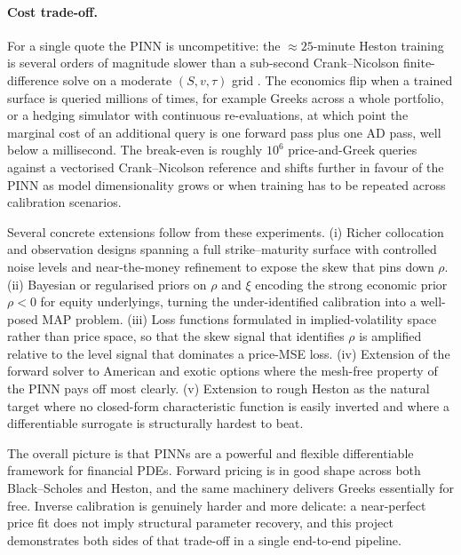 \paragraph{Cost trade-off.} For a single quote the PINN is uncompetitive: the $\approx 25$-minute Heston training is several orders of magnitude slower than a sub-second Crank--Nicolson finite-difference solve on a moderate $(S,v,\tau)$ grid \parencite{tavella2000pricing,achdou2005computational}. The economics flip when a trained surface is queried millions of times, for example Greeks across a whole portfolio, or a hedging simulator with continuous re-evaluations, at which point the marginal cost of an additional query is one forward pass plus one AD pass, well below a millisecond. The break-even is roughly $10^{6}$ price-and-Greek queries against a vectorised Crank--Nicolson reference and shifts further in favour of the PINN as model dimensionality grows or when training has to be repeated across calibration scenarios.

Several concrete extensions follow from these experiments. (i) Richer collocation and observation designs spanning a full strike--maturity surface with controlled noise levels and near-the-money refinement to expose the skew that pins down $\rho$. (ii) Bayesian or regularised priors on $\rho$ and $\xi$ encoding the strong economic prior $\rho<0$ for equity underlyings, turning the under-identified calibration into a well-posed MAP problem. (iii) Loss functions formulated in implied-volatility space rather than price space, so that the skew signal that identifies $\rho$ is amplified relative to the level signal that dominates a price-MSE loss. (iv) Extension of the forward solver to American and exotic options where the mesh-free property of the PINN pays off most clearly. (v) Extension to rough Heston \parencite{euch2019roughheston} as the natural target where no closed-form characteristic function is easily inverted and where a differentiable surrogate is structurally hardest to beat.

The overall picture is that PINNs are a powerful and flexible differentiable framework for financial PDEs. Forward pricing is in good shape across both Black--Scholes and Heston, and the same machinery delivers Greeks essentially for free. Inverse calibration is genuinely harder and more delicate: a near-perfect price fit does not imply structural parameter recovery, and this project demonstrates both sides of that trade-off in a single end-to-end pipeline.

